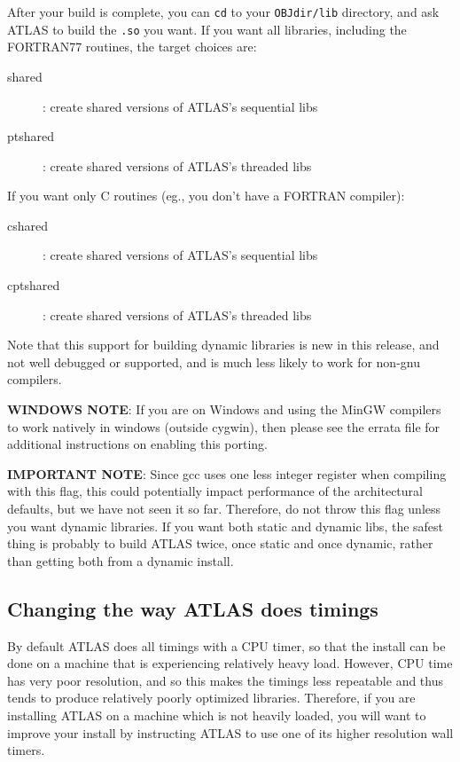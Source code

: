 \documentclass[11pt]{article}
\begin{document}
After your build is complete, you can {\tt cd} to your {\tt OBJdir/lib} 
directory, and
ask ATLAS to build the {\tt .so} you want.  If you want all libraries, including
the FORTRAN77 routines, the target choices are:
\begin{description}
\item [shared] : create shared versions of ATLAS's sequential libs
\item [ptshared] : create shared versions of ATLAS's threaded libs
\end{description}
If you want only C routines (eg., you don't have a FORTRAN compiler):
\begin{description}
\item [cshared] : create shared versions of ATLAS's sequential libs
\item [cptshared] : create shared versions of ATLAS's threaded libs
\end{description}

Note that this support for building dynamic libraries is new in this release,
and not well debugged or supported, and is much less likely to work for
non-gnu compilers.

\textbf{WINDOWS NOTE}: If you are on Windows and using the MinGW compilers
to work natively in windows (outside cygwin), then please see the errata
file for additional instructions on enabling this porting.

\textbf{IMPORTANT NOTE}: Since gcc uses one less integer register when
      compiling with this flag, this
      could potentially impact performance of the architectural defaults,
      but we have not seen it so far.  Therefore, do not throw this flag
      unless you want dynamic libraries.  If you want both static and dynamic
      libs, the safest thing is probably to build ATLAS twice, once static
      and once dynamic, rather than getting both from a dynamic install.


\subsection{Changing the way ATLAS does timings}
\label{sec-time-flags}

By default ATLAS does all timings with a CPU timer, so that the install
can be done on a machine that is experiencing relatively heavy load.  However,
CPU time has very poor resolution, and so this makes the timings less repeatable
and thus tends to produce relatively poorly optimized libraries.
Therefore, if
you are installing ATLAS on a machine which is not heavily loaded, you will
want to improve your install by instructing ATLAS to use one of its higher
resolution wall timers.
\end{document}
